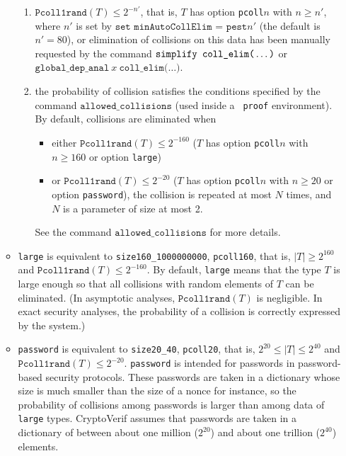 \begin{itemize}
\begin{itemize}
\begin{enumerate}
\item $\texttt{Pcoll1rand}(T) \leq 2^{-n'}$, that is, $T$ has option
  \texttt{pcoll$n$} with $n \geq n'$, where
$n'$ is set by $\texttt{set minAutoCollElim = pest}n'$ 
(the default is $n' = 80$),
or elimination of collisions
on this data has been manually requested by the command 
$\texttt{simplify coll\string_elim(}\ldots\texttt{)}$
or $\texttt{global\_dep\_anal}\ x\ \texttt{coll\_elim(}\ldots\texttt{)}$.

\sloppy

\item the probability of collision satisfies the conditions specified
  by the command $\texttt{allowed\_collisions}$ (used inside a {\tt
    proof} environment).  By default, collisions are eliminated when
  \begin{itemize}
\item either $\texttt{Pcoll1rand}(T) \leq 2^{-160}$ ($T$ has option
  \texttt{pcoll$n$} with $n \geq 160$ or option \texttt{large})
\item or
  $\texttt{Pcoll1rand}(T) \leq 2^{-20}$ ($T$ has option
  \texttt{pcoll$n$} with $n \geq 20$ or option \texttt{password}), the
  collision is repeated at most $N$ times, and $N$ is a parameter of
  size at most 2.  
\end{itemize}
See the command $\texttt{allowed\_collisions}$ for more details.
\fussy

\end{enumerate}

\item \texttt{large} is equivalent to \texttt{size160\_1000000000}, \texttt{pcoll160}, that is, $|T| \geq 2^{160}$ and $\texttt{Pcoll1rand}(T) \leq 2^{-160}$.
By default, \texttt{large} means that the type $T$ is large enough so that
all collisions with random elements of $T$ can be eliminated. 
(In asymptotic analyses, $\texttt{Pcoll1rand}(T)$ is negligible. 
In exact security analyses, the
probability of a collision is correctly expressed by the system.)

\item \texttt{password} is equivalent to \texttt{size20\_40}, \texttt{pcoll20},
that is, $2^{20} \leq |T| \leq 2^{40}$ and $\texttt{Pcoll1rand}(T) \leq 2^{-20}$.
\texttt{password} is intended for passwords in password-based
security protocols. These passwords are taken in a dictionary whose
size is much smaller than the size of a nonce for instance,
so the probability of collisions among passwords is larger 
than among data of \texttt{large} types. CryptoVerif
assumes that passwords are taken in a dictionary of between about one 
million ($2^{20}$) and about one trillion ($2^{40}$) elements.


\end{itemize}
\end{itemize}
